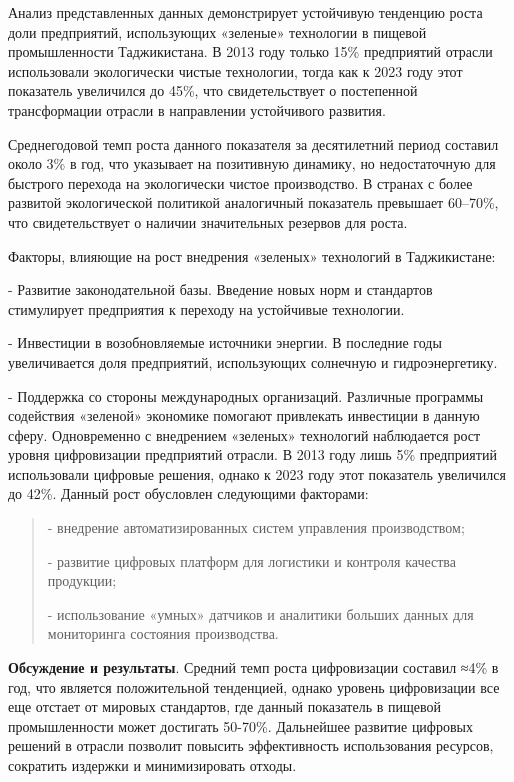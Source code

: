 Анализ представленных данных демонстрирует устойчивую тенденцию роста
доли предприятий, использующих «зеленые» технологии в пищевой
промышленности Таджикистана. В 2013 году только 15\% предприятий отрасли
использовали экологически чистые технологии, тогда как к 2023 году этот
показатель увеличился до 45\%, что свидетельствует о постепенной
трансформации отрасли в направлении устойчивого развития.

Среднегодовой темп роста данного показателя за десятилетний период
составил около 3\% в год, что указывает на позитивную динамику, но
недостаточную для быстрого перехода на экологически чистое производство.
В странах с более развитой экологической политикой аналогичный
показатель превышает 60--70\%, что свидетельствует о наличии
значительных резервов для роста.

Факторы, влияющие на рост внедрения «зеленых» технологий в Таджикистане:


- Развитие законодательной базы. Введение новых норм и стандартов
стимулирует предприятия к переходу на устойчивые технологии.

- Инвестиции в возобновляемые источники энергии. В последние годы
увеличивается доля предприятий, использующих солнечную и
гидроэнергетику.

- Поддержка со стороны международных организаций. Различные программы
содействия «зеленой» экономике помогают привлекать инвестиции в данную
сферу.
Одновременно с внедрением «зеленых» технологий наблюдается рост уровня
цифровизации предприятий отрасли. В 2013 году лишь 5\% предприятий
использовали цифровые решения, однако к 2023 году этот показатель
увеличился до 42\%. Данный рост обусловлен следующими факторами:

\begin{quote}
- внедрение автоматизированных систем управления производством;

- развитие цифровых платформ для логистики и контроля качества
продукции;

- использование «умных» датчиков и аналитики больших данных для
мониторинга состояния производства.
\end{quote}

{\bfseries Обсуждение и результаты}. Средний темп роста цифровизации
составил ≈4\% в год, что является положительной тенденцией, однако
уровень цифровизации все еще отстает от мировых стандартов, где данный
показатель в пищевой промышленности может достигать 50-70\%. Дальнейшее
развитие цифровых решений в отрасли позволит повысить эффективность
использования ресурсов, сократить издержки и минимизировать отходы.

